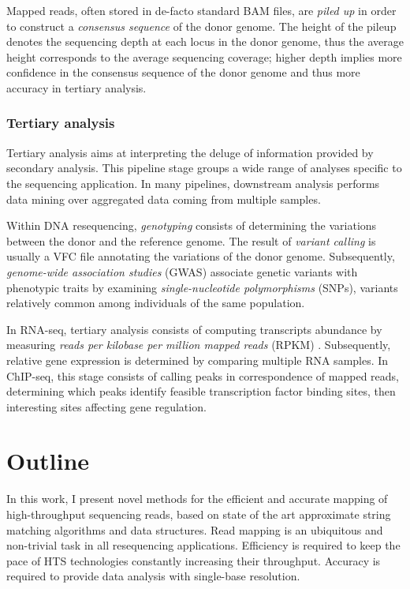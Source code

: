 Mapped reads, often stored in de-facto standard BAM files, are \emph{piled up} in order to construct a \emph{consensus sequence} of the donor genome.
The height of the pileup denotes the sequencing depth at each locus in the donor genome, thus the average height corresponds to the average sequencing coverage;
higher depth implies more confidence in the consensus sequence of the donor genome and thus more accuracy in tertiary analysis.

\subsubsection{Tertiary analysis}

Tertiary analysis aims at interpreting the deluge of information provided by secondary analysis.
This pipeline stage groups a wide range of analyses specific to the sequencing application.
In many pipelines, downstream analysis performs data mining over aggregated data coming from multiple samples.

Within DNA resequencing, \emph{genotyping} consists of determining the variations between the donor and the reference genome.
The result of \emph{variant calling} is usually a VFC file annotating the variations of the donor genome.
Subsequently, \emph{genome-wide association studies} (GWAS) associate genetic variants with phenotypic traits by examining \emph{single-nucleotide polymorphisms} (SNPs), variants relatively common among individuals of the same population.

In RNA-seq, tertiary analysis consists of computing transcripts abundance by measuring \emph{reads per kilobase per million mapped reads} (RPKM) \citep{Mortazavi2008}.
Subsequently, relative gene expression is determined by comparing multiple RNA samples.
In ChIP-seq, this stage consists of calling peaks in correspondence of mapped reads, determining which peaks identify feasible transcription factor binding sites, then interesting sites affecting gene regulation.


\section{Outline}

In this work, I present novel methods for the efficient and accurate mapping of high-throughput sequencing reads, based on state of the art approximate string matching algorithms and data structures.
Read mapping is an ubiquitous and non-trivial task in all resequencing applications.
Efficiency is required to keep the pace of HTS technologies constantly increasing their throughput.
Accuracy is required to provide data analysis with single-base resolution.


